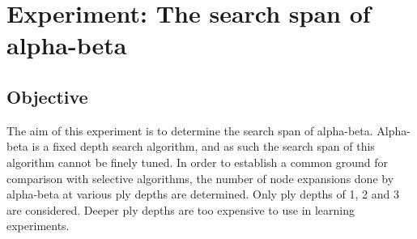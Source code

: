 \section{Experiment: The search span of alpha-beta} 
\label{sec:tree-exp-ab-span}
\subsection*{Objective} 
The aim of this experiment is to determine the search span of alpha-beta.  Alpha-beta is a fixed depth search algorithm, and as such the search span of this algorithm cannot be finely tuned.  In order to establish a common ground for comparison with selective algorithms, the number of node expansions done by alpha-beta at various ply depths are determined. Only ply depths of 1, 2 and 3 are considered.  Deeper ply depths are too expensive to use in learning experiments.  
   
